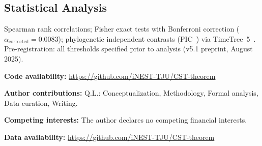 \documentclass[12pt]{article}
\begin{document}
\subsection{Statistical Analysis}

Spearman rank correlations; Fisher exact tests with Bonferroni correction ($\alpha_{\mathrm{corrected}} = 0.0083$); phylogenetic independent contrasts (PIC~\cite{felsenstein1985}) via TimeTree~5~\cite{kumar2022}. Pre-registration: all thresholds specified prior to analysis (v5.1 preprint, August 2025).

\textbf{Code availability:} \url{https://github.com/iNEST-TJU/CST-theorem}





\bigskip
\noindent\textbf{Author contributions:} Q.L.: Conceptualization, Methodology, Formal analysis, Data curation, Writing.

\noindent\textbf{Competing interests:} The author declares no competing financial interests.

\noindent\textbf{Data availability:} \url{https://github.com/iNEST-TJU/CST-theorem}
\end{document}
